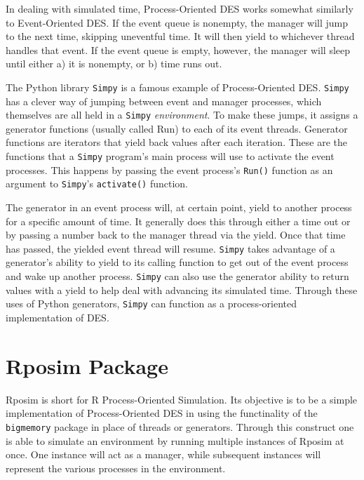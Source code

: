\documentclass[a4paper, 11pt]{article} %
\begin{document}
In dealing with simulated time, Process-Oriented DES works somewhat similarly to Event-Oriented DES. If the event queue is nonempty, the manager will jump to the next time, skipping uneventful time. It will then yield to whichever thread handles that event. If the event queue is empty, however, the manager will sleep until either a) it is nonempty, or b) time runs out. 

The Python library \texttt{Simpy} is a famous example of Process-Oriented DES. \texttt{Simpy} has a clever way of jumping between event and manager processes, which themselves are all held in a \texttt{Simpy} \textit{environment}. To make these jumps, it assigns a generator functions (usually called Run) to each of its event threads. Generator functions are iterators that yield back values after each iteration. These are the functions that a \texttt{Simpy} program’s main process will use to activate the event processes. This happens by passing the event process’s \texttt{Run()} function as an argument to \texttt{Simpy}’s \texttt{activate()} function.

The generator in an event process will, at certain point, yield to another process for a specific amount of time. It generally does this through either a time out or by passing a number back to the manager thread via the yield. Once that time has passed, the yielded event thread will resume. \texttt{Simpy} takes advantage of a generator’s ability to yield to its calling function to get out of the event process and wake up another process. \texttt{Simpy} can also use the generator ability to return values with a yield to help deal with advancing its simulated time. Through these uses of Python generators, \texttt{Simpy} can function as a process-oriented implementation of DES.


\section{Rposim Package}

Rposim is short for R Process-Oriented Simulation. Its objective is to be a simple implementation of Process-Oriented DES in using the functinality of the \texttt{bigmemory} package in place of threads or generators. Through this construct one is able to simulate an environment by running multiple instances of Rposim at once. One instance will act as a manager, while subsequent instances will represent the various processes in the environment.
\end{document}
